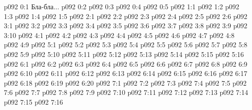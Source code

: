 \author{Мелхиседек}
\vs p092 0:1  Бла-бла...
\vs p092 0:2 
\vs p092 0:3 
\vs p092 0:4 
\vs p092 0:5 \pc 
{}
\vs p092 1:1 
\vs p092 1:2 
\vs p092 1:3 
\vs p092 1:4 
\vs p092 1:5 
\vs p092 2:1 
\vs p092 2:2 
\vs p092 2:3 
\vs p092 2:4 
\vs p092 2:5 
\vs p092 2:6 
\vs p092 3:1 
\vs p092 3:2 
\vs p092 3:3 \pc 
\vs p092 3:4 \pc 
\vs p092 3:5 
\vs p092 3:6 
\vs p092 3:7 
\vs p092 3:8 \pc 
\vs p092 3:9 \pc 
\vs p092 3:10 
\vs p092 4:1 
\vs p092 4:2 
\vs p092 4:3 
\vs p092 4:4 \pc 
\vs p092 4:5 
\vs p092 4:6 
\vs p092 4:7 
\vs p092 4:8 
\vs p092 4:9 
\vs p092 5:1 
\vs p092 5:2 
\vs p092 5:3 
\vs p092 5:4 
\vs p092 5:5 \pc 
\vs p092 5:6 
\vs p092 5:7 
\vs p092 5:8 
\vs p092 5:9 
\vs p092 5:10 
\vs p092 5:11 
\vs p092 5:12 
\vs p092 5:13 
\vs p092 5:14 
\vs p092 5:15 
\vs p092 5:16 \pc 
{}
\vs p092 6:1 
\vs p092 6:2 \pc 
\vs p092 6:3 
\vs p092 6:4 
\vs p092 6:5 
\vs p092 6:6 
\vs p092 6:7 
\vs p092 6:8 
\vs p092 6:9 
\vs p092 6:10 
\vs p092 6:11 
\vs p092 6:12 
\vs p092 6:13 
\vs p092 6:14 \pc 
\vs p092 6:15 
\vs p092 6:16 
\vs p092 6:17 
\vs p092 6:18 
\vs p092 6:19 
\vs p092 6:20 \pc 
{}
\vs p092 7:1 
\vs p092 7:2 
\vs p092 7:3 
\vs p092 7:4 
\vs p092 7:5 \pc 
\vs p092 7:6 
\vs p092 7:7 
\vs p092 7:8 
\vs p092 7:9 
\vs p092 7:10 
\vs p092 7:11 \pc 
\vs p092 7:12 
\vs p092 7:13 \pc 
\vs p092 7:14 
\vs p092 7:15 \pc 
\vsetoff
\vs p092 7:16 
\quizlink
